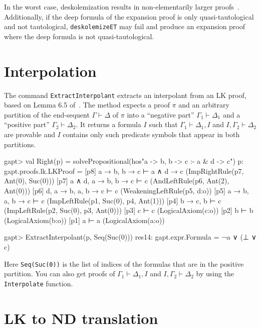 \documentclass[a4paper,11pt]{book}
\newcommand{\seq}{\vdash}	%
\begin{document}
In the worst case, deskolemization results in non-elementarily larger
proofs~\cite{Aguilera2016Unsound}.  Additionally, if the deep formula of the
expansion proof is only quasi-tautological and not tautological,
\texttt{deskolemizeET} may fail and produce an expansion proof where the deep
formula is not quasi-tautological.

\section{Interpolation}

The command \texttt{ExtractInterpolant} extracts an interpolant from an LK
proof, based on Lemma 6.5 of~\cite{Takeuti87Proof}.  The method expects a proof
$\pi$ and an arbitrary partition of the end-sequent $\Gamma \seq \Delta$ of
$\pi$ into a ``negative part'' $\Gamma_1\seq\Delta_1$ and a ``positive part''
$\Gamma_2 \seq \Delta_2$.  It returns a formula $I$ such that
$\Gamma_1\seq\Delta_1, I$ and $I,\Gamma_2\seq\Delta_2$ are provable and $I$
contains only such predicate symbols that appear in both partitions.

\begin{clilisting}
gapt> val Right(p) = solvePropositional(hos"a -> b, b -> c :- a & d -> c")
p: gapt.proofs.lk.LKProof =
[p8] a → b, b → c ⊢ a ∧ d → c    (ImpRightRule(p7, Ant(0), Suc(0)))
[p7] a ∧ d, a → b, b → c ⊢ c    (AndLeftRule(p6, Ant(2), Ant(0)))
[p6] d, a → b, a, b → c ⊢ c    (WeakeningLeftRule(p5, d:o))
[p5] a → b, a, b → c ⊢ c    (ImpLeftRule(p1, Suc(0), p4, Ant(1)))
[p4] b → c, b ⊢ c    (ImpLeftRule(p2, Suc(0), p3, Ant(0)))
[p3] c ⊢ c    (LogicalAxiom(c:o))
[p2] b ⊢ b    (LogicalAxiom(b:o))
[p1] a ⊢ a    (LogicalAxiom(a:o))

gapt> ExtractInterpolant(p, Seq(Suc(0)))
res14: gapt.expr.Formula = ¬a ∨ (⊥ ∨ c)

\end{clilisting}

Here \texttt{Seq(Suc(0))} is the list of indices of the formulas that are in
the positive partition.  You can also get proofs of $\Gamma_1 \vdash \Delta_1,
I$ and $I, \Gamma_2 \vdash \Delta_2$ by using the \texttt{Interpolate}
function.

\section{LK to ND translation}
\end{document}

